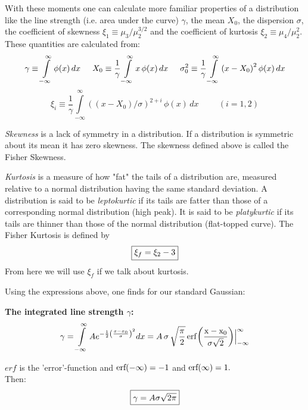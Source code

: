 \documentclass[10pt,a4paper]{report}
\def\epow{A{e^{-\frac{1}{2} {\left(\frac{x - x_0}{\sigma}\right)}^2}}}
\def\erf{\rm erf}
\begin{document}
\begin{flushleft}
With these moments one can calculate more familiar properties of a 
distribution like the line strength (i.e. area under the curve) 
$\gamma$, the mean $X_0$,
the dispersion $\sigma$, the coefficient of skewness
$\xi_1 \equiv \mu_3/\mu_2^{3/2}$ and the coefficient of kurtosis 
$\xi_2 \equiv \mu_4/\mu_2^2$. These quantities are calculated from:
$$\gamma \equiv \int\limits_{-\infty}^{\infty} \phi(x)\, dx
\hspace{0.5cm} 
X_0 \equiv \frac{1}{\gamma}\int\limits_{-\infty}^{\infty}x\, \phi(x)\,dx
\hspace{0.5cm} 
\sigma^2_0 \equiv \frac{1}{\gamma}\int\limits_{-\infty}^{\infty} 
{(x-X_0)}^2\,\phi(x)\,dx 
$$
\begin{equation}
\xi_i \equiv \frac{1}{\gamma}\int\limits_{-\infty}^{\infty}
\left((x-X_0)/\sigma\right)^{2+i}\,\phi(x)\,dx \hspace{1cm} (i=1,2) 
\end{equation}

{\it Skewness} is a lack of symmetry in a distribution.
If a distribution is symmetric about its mean it has zero skewness.
The skewness defined above is called the Fisher Skewness.

{\it Kurtosis} is a measure of how "fat" the tails of a distribution are,
measured relative to a normal distribution having the same
standard deviation. A distribution is said to be {\it leptokurtic}
if its tails are fatter than those of a corresponding normal distribution
(high peak).
It is said to be {\it platykurtic} if its tails are thinner than those of the
normal distribution (flat-topped curve). The Fisher Kurtosis is defined by
\begin{equation}
\framebox{$\xi_f = \xi_2 - 3$}  
\end{equation} 
From here we will use $\xi_f$ if we talk about kurtosis.

Using the expressions above, one finds for our standard Gaussian:

\medskip
{\bf The integrated line strength $\gamma $:}
$$ \gamma = \int\limits_{-\infty}^{\infty} \epow dx =
 A\,\sigma\, \sqrt{\frac{\pi}{2}}\, 
\erf {\left(\frac{x-x_0}{\sigma\sqrt{2}}\right)} \Bigr|_{-\infty}^{\infty}$$

$erf$ is the 'error'-function and $\erf (-\infty) = -1$ and $\erf (\infty)= 1.$\\
Then:
\begin{equation}
\framebox{$\gamma = A\sigma\sqrt{2\pi}$}
\end{equation} 


\end{flushleft}
\end{document}
